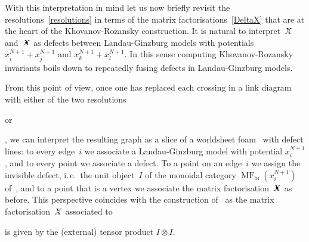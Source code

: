 \documentclass{compositio}
\theoremstyle{definition}
\numberwithin{equation}{section}
\begin{document}
With this interpretation in mind let us now briefly revisit the resolutions~\eqref{resolutions} in terms of the matrix factorisations~\eqref{DeltaX} that are at the heart of the Khovanov-Rozansky construction. It is natural to interpret~$\Xcirc$ and~$\Xbul$ as defects between Landau-Ginzburg models with potentials $x^{N+1}_{i}+x^{N+1}_{j}$ and $x^{N+1}_{k}+x^{N+1}_{l}$. In this sense computing Khovanov-Rozansky invariants boils down to repeatedly fusing defects in Landau-Ginzburg models. 

From this point of view, once one has replaced each crossing in a link diagram with either of the two resolutions 
\begin{minipage}{0.36cm}
\end{minipage}
 or 
 \begin{minipage}{0.36cm}
\end{minipage}
, we can interpret the resulting graph as a slice of a worldsheet foam~\cite{kr0404189, msv0708.2228} with defect lines: to every edge~$i$ we associate a Landau-Ginzburg model with potential $x_{i}^{N+1}$, and to every point we associate a defect. To a point on an edge~$i$ we assign the invisible defect, i.\,e.~the unit object~$I$ of the monoidal category $\operatorname{MF}_{\text{bi}}(x_{i}^{N+1})$ of~\cite{cr0909.4381}, and to a point that is a vertex we associate the matrix factorisation~$\Xbul$ as before. This perspective coincides with the construction of~\cite{kr0401268} as the matrix factorisation~$\Xcirc$ associated to 
\begin{minipage}{0.3cm}
\end{minipage}
 is given by the (external) tensor product $I\otimes I$. 
\end{document}
